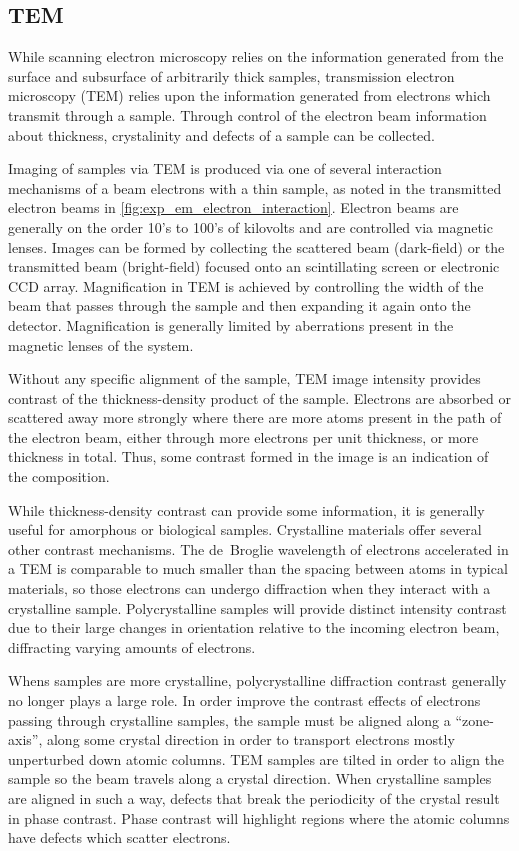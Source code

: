 \subsection{TEM} While scanning electron microscopy relies on the information generated from the surface and subsurface of arbitrarily thick samples, transmission electron microscopy (TEM) relies upon the information generated from electrons which transmit through a sample.
Through control of the electron beam information about thickness, crystalinity and defects of a sample can be collected.

Imaging of samples via TEM is produced via one of several interaction mechanisms of a beam electrons with a thin sample, as noted in the transmitted electron beams in \cref{fig:exp_em_electron_interaction}.
Electron beams are generally on the order 10's to 100's of kilovolts and are controlled via magnetic lenses\cite{Egerton2005}.
Images can be formed by collecting the scattered beam (dark-field) or the transmitted beam (bright-field) focused onto an scintillating screen or electronic CCD array.
Magnification in TEM is achieved by controlling the width of the beam that passes through the sample and then expanding it again onto the detector.
Magnification is generally limited by aberrations present in the magnetic lenses of the system.

Without any specific alignment of the sample, TEM image intensity provides contrast of the thickness-density product of the sample\cite{Egerton2005}.
Electrons are absorbed or scattered away more strongly where there are more atoms present in the path of the electron beam, either through more electrons per unit thickness, or more thickness in total.
Thus, some contrast formed in the image is an indication of the composition.

While thickness-density contrast can provide some information, it is generally useful for amorphous or biological samples.
Crystalline materials offer several other contrast mechanisms.
The de~Broglie wavelength of electrons accelerated in a TEM is comparable to much smaller than the spacing between atoms in typical materials, so those electrons can undergo diffraction when they interact with a crystalline sample.
Polycrystalline samples will provide distinct intensity contrast due to their large changes in orientation relative to the incoming electron beam, diffracting varying amounts of electrons\cite{Egerton2005}.

Whens samples are more crystalline, polycrystalline diffraction contrast generally no longer plays a large role.
In order improve the contrast effects of electrons passing through crystalline samples, the sample must be aligned along a ``zone-axis'', along some crystal direction in order to transport electrons mostly unperturbed down atomic columns.
TEM samples are tilted in order to align the sample so the beam travels along a crystal direction.
When crystalline samples are aligned in such a way, defects that break the periodicity of the crystal result in phase contrast.
Phase contrast will highlight regions where the atomic columns have defects which scatter electrons\cite{Egerton2005}.


